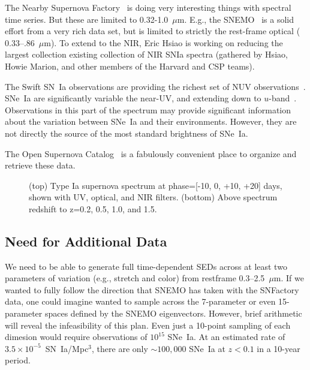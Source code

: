 \documentclass[12pt,preprint]{aastex}
\newcommand{\snia}{SN~Ia\xspace}
\newcommand{\sneia}{SNe~Ia\xspace}
\newcommand{\tbd}{{\color{red}}}
\begin{document}

The Nearby Supernova Factory~\citep{Aldering02} is doing very interesting things with spectral time series.  But these are limited to 0.32-1.0~$\mu$m.  E.g., the SNEMO~\citep{Saunders18} is a solid effort from a very rich data set, but is limited to strictly the rest-frame optical ($0.33$--$.86$~$\mu$m).  To extend to the NIR, Eric Hsiao is working on reducing the largest collection existing collection of NIR SNIa spectra (gathered by Hsiao, Howie Marion, and other members of the Harvard and CSP teams).

The Swift \snia observations are providing the richest set of NUV observations~\citep{Brown09, Milne10}.
\sneia are significantly variable the near-UV, and extending down to $u$-band~\citep{Jha06, Brown10}.  Observations in this part of the spectrum may provide significant information about the variation between \sneia and their environments.  However, they are not directly the source of the most standard brightness of \sneia.

The Open Supernova Catalog~\citep{Guillochon17} is a fabulously convenient place to organize and retrieve these data.


\begin{figure}
\caption{
    (top) Type Ia supernova spectrum at phase=[-10, 0, +10, +20] days, shown with UV, optical, and NIR filters.
    (bottom) Above spectrum redshift to z=0.2, 0.5, 1.0, and 1.5.
}
\end{figure}

\iffalse
\subsection{Need for Additional Data}

We need to be able to generate full time-dependent SEDs across at least two parameters of variation (e.g., stretch and color) from restframe 0.3--2.5~$\mu$m.  If we wanted to fully follow the direction that SNEMO has taken with the SNFactory data, one could imagine wanted to sample across the 7-parameter or even 15-parameter spaces defined by the SNEMO eigenvectors.  However, brief arithmetic will reveal the infeasibility of this plan.  Even just a 10-point sampling of each dimesion would require observations of $10^{15}$ \sneia.  At an estimated rate of $3.5\times10^{-5}$~\snia/Mpc$^{3}$, there are only $\sim100,000$ \sneia at $z<0.1$ in a 10-year period.
\end{document}
